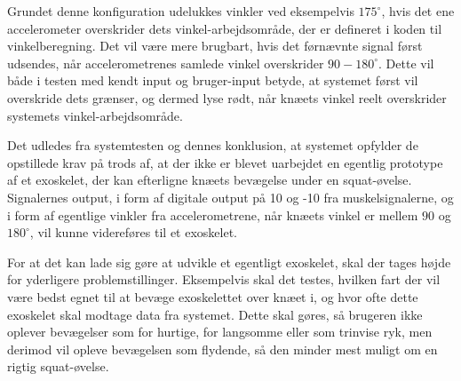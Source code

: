 Grundet denne konfiguration udelukkes vinkler ved eksempelvis $175^{\circ}$, hvis det ene accelerometer overskrider dets vinkel-arbejdsområde, der er defineret i koden til vinkelberegning.  Det vil være mere brugbart, hvis det førnævnte signal først udsendes, når accelerometrenes samlede vinkel overskrider $90-180^{\circ}$. Dette vil både i testen med kendt input og bruger-input betyde, at systemet først vil overskride dets grænser, og dermed lyse rødt, når knæets vinkel reelt overskrider systemets vinkel-arbejdsområde.

Det udledes fra systemtesten og dennes konklusion, at systemet opfylder de opstillede krav på trods af, at der ikke er blevet uarbejdet en egentlig prototype af et exoskelet, der kan efterligne knæets bevægelse under en squat-øvelse. Signalernes output, i form af digitale output på 10 og -10 fra muskelsignalerne, og i form af egentlige vinkler fra accelerometrene, når knæets vinkel er mellem $90$ og $180^{\circ}$, vil kunne videreføres til et exoskelet. 

For at det kan lade sig gøre at udvikle et egentligt exoskelet, skal der tages højde for yderligere problemstillinger. Eksempelvis skal det testes, hvilken fart der vil være bedst egnet til at bevæge exoskelettet over knæet i, og hvor ofte dette exoskelet skal modtage data fra systemet. Dette skal gøres, så brugeren ikke oplever bevægelser som for hurtige, for langsomme eller som trinvise ryk, men derimod vil opleve bevægelsen som flydende, så den minder mest muligt om en rigtig squat-øvelse.




